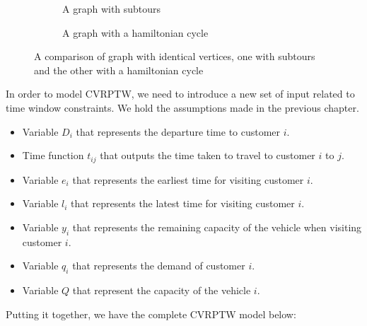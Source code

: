 \vspace{0.5cm}
\begin{figure}[!ht]
  \centering
    \begin{subfigure}{.5\textwidth}
      \centering

      \caption{A graph with subtours}
      \label{fig:subtour}
    \end{subfigure}%
    \begin{subfigure}{.5\textwidth}
      \centering
      \caption{A graph with a hamiltonian cycle}
      \label{fig:hamiltoniancycle}
    \end{subfigure}
    \caption{A comparison of graph with identical vertices, one with subtours and the other with a hamiltonian cycle}
    \label{fig:subtourillus}
\end{figure}

In order to model CVRPTW, we need to introduce a new set of input related to time window constraints. We hold the assumptions made in the previous chapter.
\begin{itemize}
\item Variable \(D_{i}\) that represents the departure time to customer \(i\).
\item Time function \(t_{ij}\) that outputs the time taken to travel to customer \(i\) to \(j\).
\item Variable \(e_{i}\) that represents the earliest time for visiting customer \(i\).
\item Variable \(l_{i}\) that represents the latest time for visiting customer \(i\).
\item Variable \(y_{i}\) that represents the remaining capacity of the vehicle when visiting customer \(i\).
\item Variable \(q_{i}\) that represents the demand of customer \(i\).
\item Variable \(Q\) that represent the capacity of the vehicle \(i\).
\end{itemize}
Putting it together, we have the complete CVRPTW model below:

